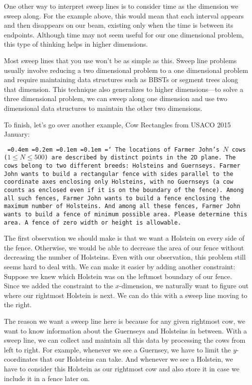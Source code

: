 One other way to interpret sweep lines is to consider time as the dimension we sweep along. For the example above, this would mean that each interval appears and then disappears on our beam, existing only when the time is between its endpoints. Although time may not seem useful for our one dimensional problem, this type of thinking helps in higher dimensions. 

Most sweep lines that you use won't be as simple as this. Sweep line problems usually involve reducing a two dimensional problem to a one dimensional problem and require maintaining data structures such as BBSTs or segment trees along that dimension. This technique also generalizes to higher dimensions---to solve a three dimensional problem, we can sweep along one dimension and use two dimensional data structures to maintain the other two dimensions.

To finish, let's go over another example, Cow Rectangles from USACO 2015 January:

\texttt{
\font=0.4em%
\font=0.2em%
\font=0.1em%
\font=0.1em%
\hyphenchar\font=`\-%
The locations of Farmer John's $N$ cows ($1 \le N \le 500$) are described by distinct points in the 2D plane. The cows belong to two different breeds: Holsteins and Guernseys. Farmer John wants to build a rectangular fence with sides parallel to the coordinate axes enclosing only Holsteins, with no Guernseys (a cow counts as enclosed even if it is on the boundary of the fence). Among all such fences, Farmer John wants to build a fence enclosing the maximum number of Holsteins. And among all these fences, Farmer John wants to build a fence of minimum possible area. Please determine this area. A fence of zero width or height is allowable.}

The first observation we should make is that we want a Holstein on every side of the fence. Otherwise, we would be able to decrease the area of our fence without decreasing the number of Holsteins. Even with our observation, this problem still seems hard to deal with. We can make it easier by adding another constraint: Suppose we knew which Holstein was on the leftmost boundary of our fence. Since we added the constraint to the $x$-dimension, we naturally want to figure out where our rightmost Holstein is next. We can do this with a sweep line moving to the right.

The reason we want a sweep line here is because for any given rightmost cow, we want to know information about the Guernseys and Holsteins in between. With a sweep line, we can collect and maintain all this data by processing the cows from left to right. For example, whenever we see a Guernsey, we have to limit the $y$-coordinates that our Holsteins can take. And whenever we see a Holstein, we have to consider this Holstein as our rightmost cow and also store it in case we include it in a fence later on.

